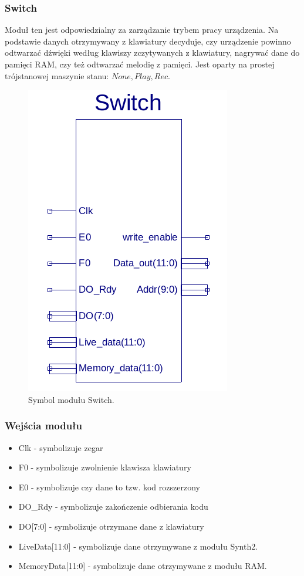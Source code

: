 \documentclass[a4paper,11pt]{article}
\begin{document}
\subsubsection{Switch}
Moduł ten jest odpowiedzialny za zarządzanie trybem pracy urządzenia. Na podstawie danych otrzymywany z klawiatury decyduje, czy urządzenie powinno odtwarzać dźwięki według klawiszy zczytywanych z klawiatury, nagrywać dane do pamięci RAM, czy też odtwarzać melodię z pamięci. Jest oparty na prostej trójstanowej maszynie stanu: $None, Play, Rec$.

\begin{figure}[H]
\center
\includegraphics[scale=0.60]{switchsymb.png}
\caption{Symbol modułu Switch.}
\end{figure}

\subsubsection*{Wejścia modułu}
\begin{itemize}
\item Clk - symbolizuje zegar
\item F0 - symbolizuje zwolnienie klawisza klawiatury
\item E0 - symbolizuje czy dane to tzw. kod rozszerzony
\item DO_Rdy - symbolizuje zakończenie odbierania kodu
\item DO[7:0] - symbolizuje otrzymane dane z klawiatury
\item LiveData[11:0] - symbolizuje dane otrzymywane z modułu Synth2.
\item MemoryData[11:0] - symbolizuje dane otrzymywane z modułu RAM.
\end{itemize}
\end{document}
